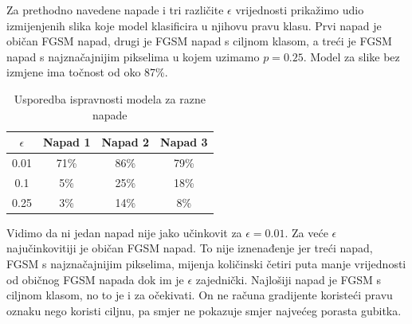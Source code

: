 Za prethodno navedene napade i tri različite $\epsilon$ vrijednosti prikažimo udio izmijenjenih slika koje model klasificira u njihovu pravu klasu. Prvi napad je običan FGSM napad, drugi je FGSM napad s ciljnom klasom, a treći je FGSM napad s najznačajnijim pikselima u kojem uzimamo $p = 0.25$. Model za slike bez izmjene ima točnost od oko 87\%.

\begin{table}[H]
	\centering
	\begin{tabular}{||c || c | c | c||} 
		\hline
		$\epsilon$ & Napad 1 & Napad 2 & Napad 3 \\ [0.5ex] 
		\hline\hline
		0.01 & 71\% & 86\% & 79\% \\ 
		0.1 & 5\% & 25\% & 18\% \\
		0.25 & 3\% & 14\% & 8\% \\ [1ex] 
		\hline
	\end{tabular}
	\caption{Usporedba ispravnosti modela za razne napade}
\end{table}

Vidimo da ni jedan napad nije jako učinkovit za $\epsilon = 0.01$. Za veće $\epsilon$ najučinkovitiji je običan FGSM napad. To nije iznenađenje jer treći napad, FGSM s najznačajnijim pikselima, mijenja količinski četiri puta manje vrijednosti od običnog FGSM napada dok im je $\epsilon$ zajednički. Najlošiji napad je FGSM s ciljnom klasom, no to je i za očekivati. On ne računa gradijente koristeći pravu oznaku nego koristi ciljnu, pa smjer ne pokazuje smjer najvećeg porasta gubitka.
